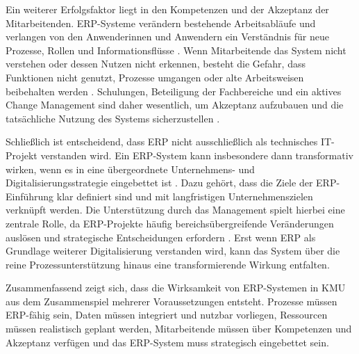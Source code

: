 Ein weiterer Erfolgsfaktor liegt in den Kompetenzen und der Akzeptanz der Mitarbeitenden. ERP-Systeme verändern 
bestehende Arbeitsabläufe und verlangen von den Anwenderinnen und Anwendern ein Verständnis für neue Prozesse, 
Rollen und Informationsflüsse \parencite{Alaskari2021,Leyh2015}. Wenn Mitarbeitende das System nicht verstehen oder dessen Nutzen nicht erkennen, 
besteht die Gefahr, dass Funktionen nicht genutzt, Prozesse umgangen oder alte Arbeitsweisen beibehalten werden \parencite{Leyh2015,Leyh2019}. 
Schulungen, Beteiligung der Fachbereiche und ein aktives Change Management sind daher wesentlich, um Akzeptanz 
aufzubauen und die tatsächliche Nutzung des Systems sicherzustellen \parencite{Noudoostbeni2009,Faruque2024}.

Schließlich ist entscheidend, dass ERP nicht ausschließlich als technisches IT-Projekt verstanden wird. Ein 
ERP-System kann insbesondere dann transformativ wirken, wenn es in eine übergeordnete Unternehmens- und 
Digitalisierungsstrategie eingebettet ist \parencite{Leyh2019}. Dazu gehört, dass die Ziele der ERP-Einführung klar definiert sind 
und mit langfristigen Unternehmenszielen verknüpft werden. Die Unterstützung durch das Management spielt hierbei 
eine zentrale Rolle, da ERP-Projekte häufig bereichsübergreifende Veränderungen auslösen und strategische 
Entscheidungen erfordern \parencite{Leyh2015, Barbieri2025}. Erst wenn ERP als Grundlage weiterer Digitalisierung verstanden 
wird, kann das System über die reine Prozessunterstützung hinaus eine transformierende Wirkung entfalten.

Zusammenfassend zeigt sich, dass die Wirksamkeit von ERP-Systemen in KMU aus dem Zusammenspiel mehrerer 
Voraussetzungen entsteht. Prozesse müssen ERP-fähig sein, Daten müssen integriert und nutzbar vorliegen, 
Ressourcen müssen realistisch geplant werden, Mitarbeitende müssen über Kompetenzen und Akzeptanz verfügen 
und das ERP-System muss strategisch eingebettet sein. 

\fi